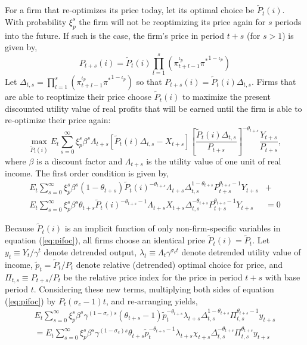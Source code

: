 \documentclass[11pt]{article}
\newcommand{\beq}{\begin{equation}}
\newcommand{\eeq}{\end{equation}}
\newcommand{\ds}{\displaystyle}
\begin{document}
For a firm that re-optimizes its price today, let its optimal choice be $\tilde{P}_t(i)$.  With probability $\xi_p^s$ the firm will not be reoptimizing its price again for $s$ periods into the future.  If such is the case, the firm's price in period $t+s$ (for $s>1$) is given by,
\beq P_{t+s}(i) = \tilde{P}_t(i) \prod_{l=1}^s (\pi_{t+l-1}^{\iota_p} {\pi^*}^{1-\iota_p}) \eeq
Let $\Delta_{t,s} = \prod_{l=1}^s (\pi_{t+l-1}^{\iota_p} {\pi^*}^{1-\iota_p})$ so that $P_{t+s}(i) = \tilde{P}_t(i) \Delta_{t,s}$.  Firms that are able to reoptimize their price choose $\tilde{P}_t(i)$ to maximize the present discounted utility value of real profits that will be earned until the firm is able to re-optimize their price again:
\beq \label{eq:intprofit} \max_{\tilde{P}_t(i)} E_t \sum_{s=0}^{\infty} \xi_p^s \beta^s \Lambda_{t+s} \left[ \tilde{P}_t(i) \Delta_{t,s} - X_{t+s} \right] \left[ \frac{ \tilde{P}_t(i) \Delta_{t,s} }{P_{t+s}} \right]^{-\theta_{t+s}} \frac{Y_{t+s}}{P_{t+s}}, \eeq
where $\beta$ is a discount factor and $\Lambda_{t+s}$ is the utility value of one unit of real income.  The first order condition is given by,
\beq \label{eq:pifoc} \begin{array}{ll} 
E_t \ds \sum_{s=0}^\infty \xi_p^s \beta^s (1-\theta_{t+s}) \tilde{P}_t(i)^{-\theta_{t+s}}  \Lambda_{t+s} \Delta_{t,s}^{1-\theta_{t+s}} P_{t+s}^{\theta_{t+s}-1} Y_{t+s}  & + \\ [1.5pc]
E_t \ds \sum_{s=0}^\infty \xi_p^s \beta^s \theta_{t+s} \tilde{P}_t(i)^{-\theta_{t+s}-1}  \Lambda_{t+s} X_{t+s}  \Delta_{t,s}^{-\theta_{t+s}} P_{t+s}^{\theta_{t+s}-1} Y_{t+s} & = 0 
\end{array}\eeq

Because $\tilde{P}_t(i)$ is an implicit function of only non-firm-specific variables in equation (\ref{eq:pifoc}), all firms choose an identical price $\tilde{P}_t(i) = \tilde{P}_t$.  Let $y_t \equiv {Y_t}/{\gamma^t}$ denote detrended output, $\lambda_t \equiv \Lambda_t \gamma^{\sigma_c t}$ denote detrended utility value of income, $\tilde{p}_t = {\tilde{P}_t}/{P_t}$ denote relative (detrended) optimal choice for price, and $\Pi_{t,s} \equiv {P_{t+s}}/{P_t}$ be the relative price index for the price in period $t+s$ with base period $t$.  Considering these new terms, multiplying both sides of equation (\ref{eq:pifoc}) by $P_t (\sigma_c-1)t$, and re-arranging yields,
\beq \label{eq:pifoc-det} \begin{array}{l} \ds E_t \sum_{s=0}^{\infty} \xi_p^s \beta^s \gamma^{(1-\sigma_c)s}(\theta_{t+s}-1) \tilde{p}_t^{-\theta_{t+s}} \lambda_{t+s} \Delta_{t,s}^{1-\theta_{t+s}} \Pi_{t,s}^{\theta_{t+s}-1} y_{t+s} \\ [1.5pc]
= \ds E_t \sum_{s=0}^{\infty} \xi_p^s \beta^s \gamma^{(1-\sigma_c)s} \theta_{t+s} \tilde{p}_t^{-\theta_{t+s}-1} \lambda_{t+s} \chi_{t+s} \Delta_{t,s}^{-\theta_{t+s}} \Pi_{t,s}^{\theta_{t+s}} y_{t+s}  \end{array} \eeq
\end{document}
